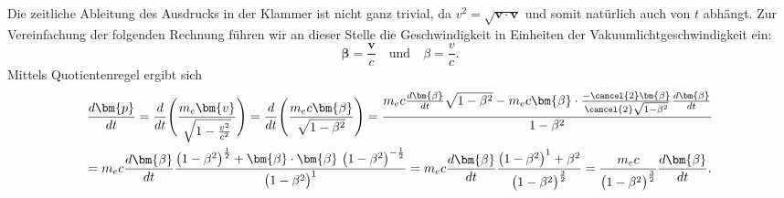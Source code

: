 Die zeitliche Ableitung des Ausdrucks in der Klammer ist nicht ganz trivial,
da \(v^2=\sqrt{\bm{v}\cdot\bm{v}}\)
und somit natürlich auch von \(t\) abhängt.
Zur Vereinfachung der folgenden Rechnung führen wir an dieser Stelle
die Geschwindigkeit in Einheiten der Vakuumlichtgeschwindigkeit ein:
\begin{equation*}
    \bm{\beta} = \frac{\bm{v}}{c} \quad \text{und} \quad
    \beta = \frac{v}{c}.
\end{equation*}
Mittels Quotientenregel ergibt sich
\begin{multline*}
    \frac{d\bm{p}}{dt}
    = \frac{d}{dt} \Biggl(\frac{m_e \bm{v}}{\sqrt{1-\frac{v^2}{c^2}}}\Biggr)
    = \frac{d}{dt} \Biggl(\frac{m_e c \bm{\beta}}{\sqrt{1-\beta^2}}\Biggr)
    = \frac{m_ec\frac{d\bm{\beta}}{dt}\sqrt{1-\beta^2}
    -m_ec\bm{\beta}\cdot\frac{-\cancel{2}\bm{\beta}}{\cancel{2}\sqrt{1-\beta^2}}
    \frac{d\bm{\beta}}{dt}}{1-\beta^2}\\
    = m_ec\frac{d\bm{\beta}}{dt}\frac{\bigl(1-\beta^2\bigr)^\frac{1}{2}
    +\bm{\beta}\cdot\bm{\beta} \ \bigl(1-\beta^2\bigr)^{-\frac{1}{2}}}
    {\bigl(1-\beta^2\bigr)^1}
    = m_ec\frac{d\bm{\beta}}{dt}\frac{\bigl(1-\beta^2\bigr)^1
    +\beta^2}{\bigl(1-\beta^2\bigr)^\frac{3}{2}}
    = \frac{m_ec}{\bigl(1-\beta^2\bigr)^\frac{3}{2}}\frac{d\bm{\beta}}{dt}.
\end{multline*}

